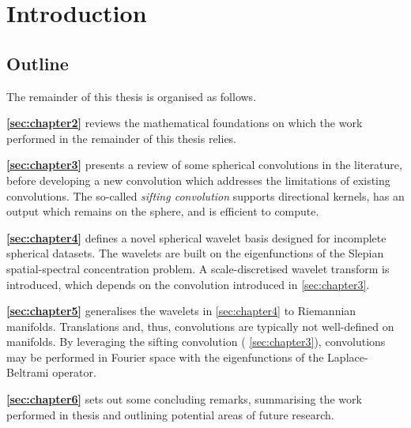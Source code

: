 \chapter{Introduction}\label{sec:chapter1}

\section{Outline}

The remainder of this thesis is organised as follows.

\begin{hangparas}{24pt}{1}
	\textbf{\cref{sec:chapter2}} reviews the mathematical foundations on which the work performed in the remainder of this thesis relies.

	\textbf{\cref{sec:chapter3}} presents a review of some spherical convolutions in the literature, before developing a new convolution which addresses the limitations of existing convolutions.
	The so-called \emph{sifting convolution} supports directional kernels, has an output which remains on the sphere, and is efficient to compute.

	\textbf{\cref{sec:chapter4}} defines a novel spherical wavelet basis designed for incomplete spherical datasets.
	The wavelets are built on the eigenfunctions of the Slepian spatial-spectral concentration problem.
	A scale-discretised wavelet transform is introduced, which depends on the convolution introduced in \cref{sec:chapter3}.

	\textbf{\cref{sec:chapter5}} generalises the wavelets in \cref{sec:chapter4} to Riemannian manifolds.
	Translations and, thus, convolutions are typically not well-defined on manifolds.
	By leveraging the sifting convolution (\cf{} \cref{sec:chapter3}), convolutions may be performed in Fourier space with the eigenfunctions of the Laplace-Beltrami operator.

	\textbf{\cref{sec:chapter6}} sets out some concluding remarks, summarising the work performed in thesis and outlining potential areas of future research.
\end{hangparas}
